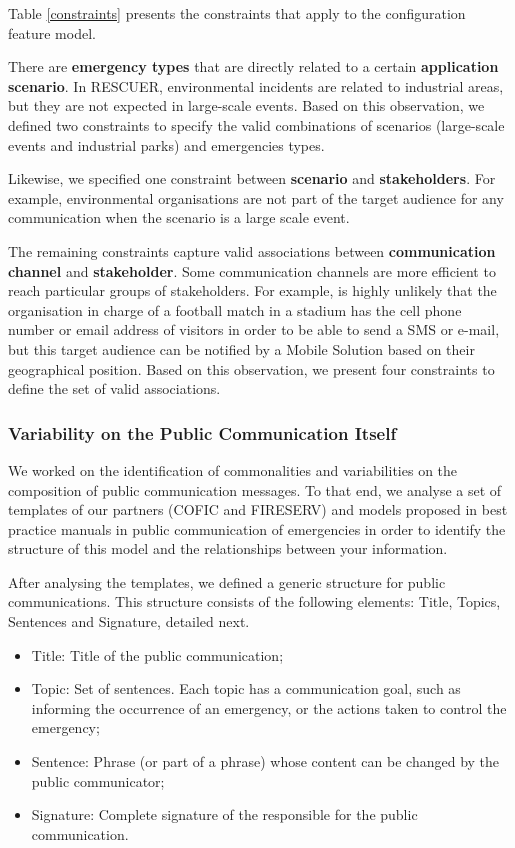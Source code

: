 Table \ref{constraints} presents the constraints that apply to the configuration feature model.

There are \textbf{emergency types} that are directly related to a certain \textbf{application scenario}. In RESCUER, environmental incidents are related to industrial areas, but they are not expected in large-scale events. Based on this observation, we defined two constraints to specify the valid combinations of scenarios (large-scale events and industrial parks) and emergencies types.

Likewise, we specified one constraint between \textbf{scenario} and \textbf{stakeholders}. For example, environmental organisations are not part of the target audience for any communication when the scenario is a large scale event.

The remaining constraints capture valid associations between \textbf{communication channel} and \textbf{stakeholder}. Some communication channels are more efficient to reach particular groups of stakeholders. For example, is highly unlikely that the organisation in charge of a football match in a stadium has the cell phone number or email address of visitors in order to be able to send a SMS or e-mail, but this target audience can be notified by a Mobile Solution based on their geographical position. Based on this observation, we present four constraints to define the set of valid associations.



\subsubsection{Variability on the Public Communication Itself}

We worked on the identification of commonalities and variabilities on the composition of public communication messages. To that end, we analyse a set of templates of our partners (COFIC and FIRESERV) and models proposed in best practice manuals \citep{cisvGuide} \citep{certTemplates} \citep{panamericanhealthorganization2009} in public communication of emergencies in order to identify the structure of this model and the relationships between your information. 

After analysing the templates, we defined a generic structure for public communications. This structure consists of the following elements: Title, Topics, Sentences and Signature, detailed next.

\begin{itemize}
   \item Title: Title of the public communication;
   \item Topic: Set of sentences. Each topic has a communication goal, such as informing the occurrence of an emergency, or the actions taken to control the emergency;
   \item Sentence: Phrase (or part of a phrase) whose content can be changed by the public communicator;
   \item Signature: Complete signature of the responsible for the public communication.

 \end{itemize}
 
